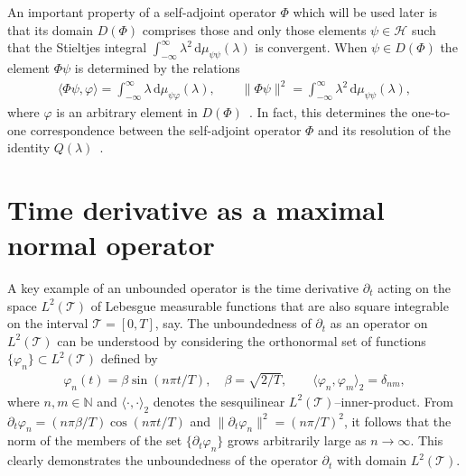 \documentclass[leqno,onefignum,onetabnum]{siamltex1213}
\renewcommand{\d}{\mathrm{d}}
\newcommand{\Tc}{\mathcal{T}}
\newcommand{\Hs}{\mathscr{H}}
\begin{document}
An important property of a self-adjoint operator $\Phi$ which will be
used later is that its domain $D(\Phi)$ comprises those and only those
elements $\psi\in\Hs$ such that the Stieltjes integral
$\int_{-\infty}^\infty\lambda^2\,\d\mu_{\psi\psi}(\lambda)$ is convergent. When $\psi\in D(\Phi)$ the element
$\Phi\psi$ is determined by the relations~\cite{Stone:64}      
%
\begin{align}\label{eq:X_Q_Correspondence}
  \langle\Phi\psi,\varphi\rangle=\int_{-\infty}^\infty\lambda\,\d\mu_{\psi\varphi}(\lambda), \qquad
  \|\Phi\psi\|^2=\int_{-\infty}^\infty\lambda^2\,\d\mu_{\psi\psi}(\lambda),
\end{align}
%
where $\varphi$ is an arbitrary element in $D(\Phi)$~\cite{Stone:64}. In fact,
this determines the one-to-one correspondence between the
self-adjoint operator $\Phi$ and its resolution of the identity
$Q(\lambda)$~\cite{Stone:64}. 





\section{Time derivative as a maximal normal
  operator}\label{sec:Time_Derivative}
%
A key example of an unbounded operator is the time derivative
$\partial_t$ acting on the space $L^2(\Tc)$ of Lebesgue measurable functions
that are also square integrable on the interval $\Tc=[0,T]$, say. The
unboundedness of $\partial_t$ as an operator on $L^2(\Tc)$ can be 
understood by considering the orthonormal set of functions
$\{\varphi_n\}\subset L^2(\Tc)$ defined by     
%
\begin{align}\label{eq:Orthonormal}
  \varphi_n(t)=\beta\sin(n\pi t/T), \quad
  \beta=\sqrt{2/T},
  \qquad
  \langle\varphi_n,\varphi_m\rangle_2=\delta_{nm},
\end{align}
%
where $n,m\in\mathbb{N}$ and $\langle\cdot,\cdot\rangle_2$ denotes the sesquilinear
$L^2(\Tc)$--inner-product. From $\partial_t\varphi_n=(n\pi\beta/T)\cos(n\pi t/T)$
and $\|\partial_t\varphi_n\|^2=(n\pi/T)^2$, it follows that the norm of the members of the set
$\{\partial_t\varphi_n\}$ grows arbitrarily large as $n\to\infty$. This clearly demonstrates
the unboundedness of the operator $\partial_t$ with domain $L^2(\Tc)$.
\end{document}
